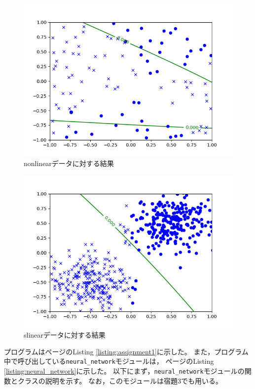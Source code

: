 \documentclass[class=jsarticle, crop=false, dvipdfmx, fleqn]{standalone}
\begin{document}
\begin{figure}[H]
    \centering
    \includegraphics[clip, width=12cm]{../figures/assignment1_1_nonlinear_result}
    \caption{nonlinearデータに対する結果}
    \label{fig:nonlinear}
\end{figure}

\begin{figure}[H]
    \centering
    \includegraphics[clip, width=12cm]{../figures/assignment1_1_slinear_result}
    \caption{slinearデータに対する結果}
    \label{fig:slinear}
\end{figure}

\clearpage

プログラムはページ\pageref{listing:assignment1}のListing \ref{listing:assignment1}に示した。
また，プログラム中で呼び出している\texttt{neural\_network}モジュールは，
ページ\pageref{listing:neural_network}のListing \ref{listing:neural_network}に示した。
以下にまず，\texttt{neural\_network}モジュールの関数とクラスの説明を示す。
なお，このモジュールは宿題3でも用いる。
\end{document}
